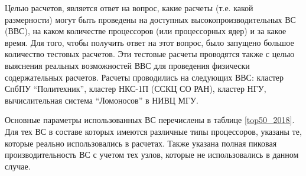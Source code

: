 Целью расчетов,  является ответ на вопрос, какие расчеты (т.е. какой размерности) могут быть проведены на доступных высокопроизводительных  ВС (ВВС), на каком количестве процессоров (или процессорных ядер) и за какое время. 
Для того, чтобы получить ответ на этот вопрос, было запущено большое количество тестовых расчетов. Эти тестовые расчеты проводятся также с целью выяснения реальных возможностей ВВС для проведения физически содержательных расчетов. 	Расчеты проводились на следующих ВВС: кластер СпбПУ “Политехник”, кластер НКС-1П (ССКЦ СО РАН), кластер НГУ,  вычислительная система “Ломоносов” в  НИВЦ МГУ. 

Основные параметры использованных ВС перечислены в таблице \ref{top50_2018}. Для тех ВС в составе которых имеются различные типы процессоров, указаны те, которые реально использовались в расчетах. Также указана полная пиковая производительность ВС с учетом тех узлов, которые не использовались в данном случае.

